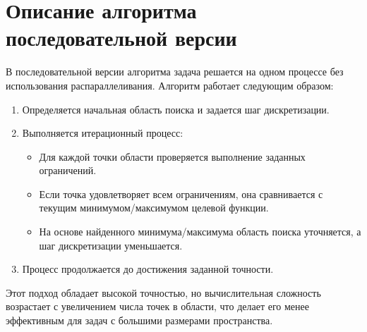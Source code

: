 \documentclass[a4paper,12pt]{article}
\begin{document}
\section*{Описание алгоритма последовательной версии}
В последовательной версии алгоритма задача решается на одном процессе без использования распараллеливания. Алгоритм работает следующим образом:
\begin{enumerate}
    \item Определяется начальная область поиска и задается шаг дискретизации.
    \item Выполняется итерационный процесс:
    \begin{itemize}
        \item Для каждой точки области проверяется выполнение заданных ограничений.
        \item Если точка удовлетворяет всем ограничениям, она сравнивается с текущим минимумом/максимумом целевой функции.
        \item На основе найденного минимума/максимума область поиска уточняется, а шаг дискретизации уменьшается.
    \end{itemize}
    \item Процесс продолжается до достижения заданной точности.
\end{enumerate}

Этот подход обладает высокой точностью, но вычислительная сложность возрастает с увеличением числа точек в области, что делает его менее эффективным для задач с большими размерами пространства.

\newpage
\end{document}
